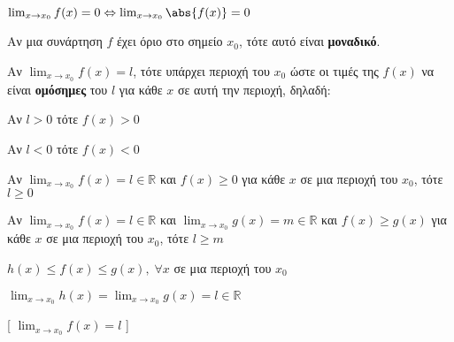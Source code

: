 \begin{prop}
  $ \lim_{x \to x_{0}} f(x) = 0 \Leftrightarrow \lim_{x \to x_{0}} \abs{f(x)} = 0 $
\end{prop}

\begin{prop}
  Αν μια συνάρτηση $ f $ έχει όριο στο σημείο $ x_{0} $, τότε αυτό είναι
  \textbf{μοναδικό}.
\end{prop}

\begin{prop}
  Αν $ \lim_{x \to x_{0}} f(x) = l $, τότε υπάρχει περιοχή του $ x_{0} $ ώστε οι τιμές 
  της $ f(x) $ να είναι \textbf{ομόσημες} του $l$ για κάθε $x$ σε αυτή την περιοχή, 
  δηλαδή:
  \begin{myitemize}
    \item Αν $ l > 0 $ τότε $ f(x)>0 $ 
    \item Αν $ l < 0 $ τότε $ f(x)<0 $ 
  \end{myitemize}
\end{prop}

\begin{prop}
\item {}
  \begin{myitemize}
    \item Αν $ \lim_{x \to x_{0}} f(x) = l \in \mathbb{R} $ και $ f(x) \geq 0 $ για κάθε 
      $x$ σε μια περιοχή του $ x_{0} $, τότε $ l \geq 0 $ 
    \item Αν $ \lim_{x \to x_{0}} f(x) = l \in \mathbb{R} $ και $ \lim_{x \to x_{0}} g(x)
      = m \in \mathbb{R}$ και $ f(x) \geq g(x) $ για κάθε $x$ σε μια περιοχή του 
      $ x_{0} $, τότε $ l \geq m $ 
  \end{myitemize}
\end{prop}

\begin{prop}
\item {}
  \begin{minipage}[t]{8.0 cm}
    \begin{myitemize}
      \item $ h(x) \leq f(x) \leq g(x), \; \forall x$ σε μια περιοχή του $ x_{0} $
        \hfill{}
      \item $ \lim_{x \to x_{0}} h(x) = \lim_{x \to x_{0}} g(x) = l \in \mathbb{R} $
        \hfill{}
    \end{myitemize}
  \end{minipage}
  [ $ \lim_{x \to x_{0}} f(x) = l $ ]
\end{prop}


